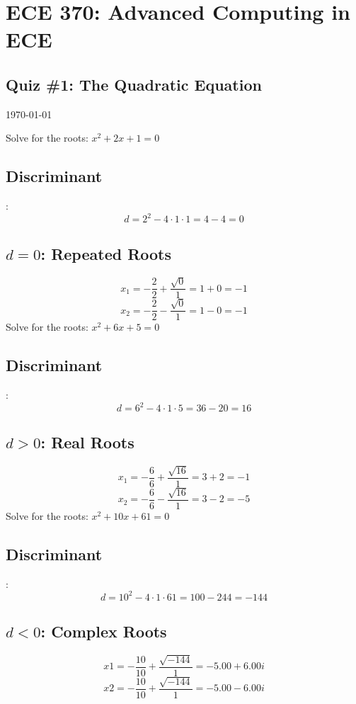 \documentclass{exam}
\begin{document}
\section*{ECE 370: Advanced Computing in ECE}
\subsection*{Quiz \#1: The Quadratic Equation}
\today \\
\vspace{10mm}
\vspace{3mm}

\begin{questions}
 \question Solve for the roots: \(x^2 +2x + 1 = 0\)

\subsection*{Discriminant}: 
\[d = 2^2 - 4\cdot 1 \cdot1 = 4 - 4 = 0\]
 \subsection*{\(d = 0\): Repeated Roots}
 \[x_1 = -\frac{2}{2} + \frac{\sqrt{0}}{1} = 1 + 0 = -1\]
 \[x_2 = -\frac{2}{2} - \frac{\sqrt{0}}{1} = 1 - 0 = -1\]
 Solve for the roots: \(x^2 +6x + 5 = 0\)

\subsection*{Discriminant}: 
\[d = 6^2 - 4\cdot 1 \cdot5 = 36 - 20 = 16\]
 \subsection*{\(d > 0\): Real Roots}
 \[x_1 = -\frac{6}{6} + \frac{\sqrt{16}}{1} = 3 + 2 = -1\]
 \[x_2 = -\frac{6}{6} - \frac{\sqrt{16}}{1} = 3 - 2 = -5\]
  Solve for the roots: \(x^2 +10x + 61 = 0\)

\subsection*{Discriminant}: 
\[d = 10^2 - 4\cdot 1 \cdot61 = 100 - 244 = -144\]
 \subsection*{\(d < 0\): Complex Roots}
 \[x1 = -\frac{10}{10} + \frac{\sqrt{-144}}{1} = -5.00 + 6.00i\]
 \[x2 = -\frac{10}{10} + \frac{\sqrt{-144}}{1} = -5.00 - 6.00i\]

\end{questions}
\end{document}
